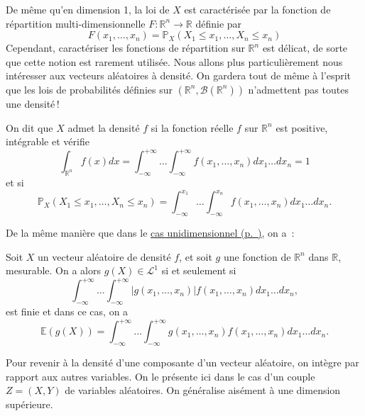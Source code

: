 De même qu'en dimension 1, la loi de \(X\) est caractérisée par la
fonction de répartition multi-dimensionnelle
\(F : \mathbb{R}^n \to \mathbb{R}\) définie par
\[F(x_1,\ldots,x_n) = \mathbb{P}_X(X_1\leq x_1,\ldots,X_n\leq x_n)\]
Cependant, caractériser les fonctions de répartition sur
\(\mathbb{R}^n\) est délicat, de sorte que cette notion est rarement
utilisée. Nous allons plus particulièrement nous intéresser aux vecteurs
aléatoires à densité. On gardera tout de même à l'esprit que les lois de
probabilités définies sur \((\mathbb{R}^n,\mathcal{B}(\mathbb{R}^n))\)
n'admettent pas toutes une densité\,!

\begin{definition}\label{II-defvect}

On dit que \(X\) admet la densité \(f\) si la fonction réelle \(f\) sur
\(\mathbb{R}^n\) est positive, intégrable et vérifie
\[\int_{\mathbb{R}^n} f(x) dx = \int_{-\infty}^{+\infty} \ldots \int_{-\infty}^{+\infty} f(x_1,\ldots,x_n) dx_1 \ldots dx_n= 1\]
et si
\[\mathbb{P}_X(X_1\leq x_1,\ldots,X_n\leq x_n) = \int_{-\infty}^{x_1} \ldots \int_{-\infty}^{x_n} f(x_1,\ldots,x_n) dx_1 \ldots dx_n.\]
\end{definition}

De la même manière que dans le \protect\hyperref[II-esperanceg]{cas
unidimensionnel (p.~\pageref*{II-esperanceg})}, on a~:

\begin{proposition}\label{II-esperancegvect}

Soit \(X\) un vecteur aléatoire de densité \(f\), et soit \(g\) une
fonction de \(\mathbb{R}^n\) dans \(\mathbb{R}\), mesurable. On a alors
\(g(X)\in \mathcal{L}^1\) si et seulement si
\[\int_{-\infty}^{+\infty} \ldots \int_{-\infty}^{+\infty} |g(x_1,\ldots,x_n)|f(x_1,\ldots,x_n) dx_1 \ldots dx_n,\]
est finie et dans ce cas, on a
\[\mathbb{E}(g(X)) = \int_{-\infty}^{+\infty} \ldots \int_{-\infty}^{+\infty} g(x_1,\ldots,x_n)f(x_1,\ldots,x_n) dx_1 \ldots dx_n.\]
\end{proposition}

Pour revenir à la densité d'une composante d'un vecteur aléatoire, on
intègre par rapport aux autres variables. On le présente ici dans le cas
d'un couple \(Z=(X,Y)\) de variables aléatoires. On généralise aisément
à une dimension supérieure.


